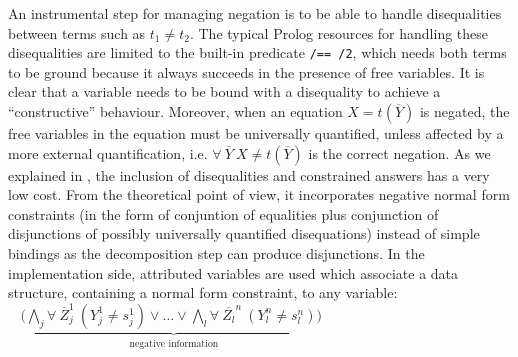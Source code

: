 \documentclass{tlp}
\begin{document}
An instrumental step for managing negation is to be able to handle
disequalities between terms such as $t_1 \neq t_2$.  The typical
Prolog resources for handling these disequalities are limited to the
built-in predicate {\tt /== /2}, which needs both terms to be ground
because it always succeeds in the presence of free variables.  It is
clear that a variable needs to be bound with a disequality to achieve
a ``constructive'' behaviour.  Moreover, when an equation $X =
t(\overline{Y})$ is negated, the free variables in the equation must
be universally quantified, unless affected by a more external
quantification, i.e. $\forall~ \overline{Y}~X \neq t(\overline{Y})$ is
the correct negation.  As we explained in \cite{SusanaPADL2000}, the
inclusion of disequalities and constrained answers has a very low
cost. From the theoretical point of view, it incorporates negative normal form 
constraints (in the form of conjuntion of equalities plus conjunction of 
disjunctions of possibly universally quantified
disequations) instead of simple bindings as the decomposition step can produce 
disjunctions. In the implementation side, attributed variables are used 
which associate a data structure, containing a
normal form constraint, to any variable: $~~~~( \underbrace{\bigwedge_j \forall~ \overline{Z}_j^1~(Y_j^1 \neq s_j^1) 
\vee \ldots \vee \bigwedge_l \forall~ \overline{Z_l}^n~(Y_l^n \neq s_l^n) ) }_{\mbox{negative information}} $




\end{document}
